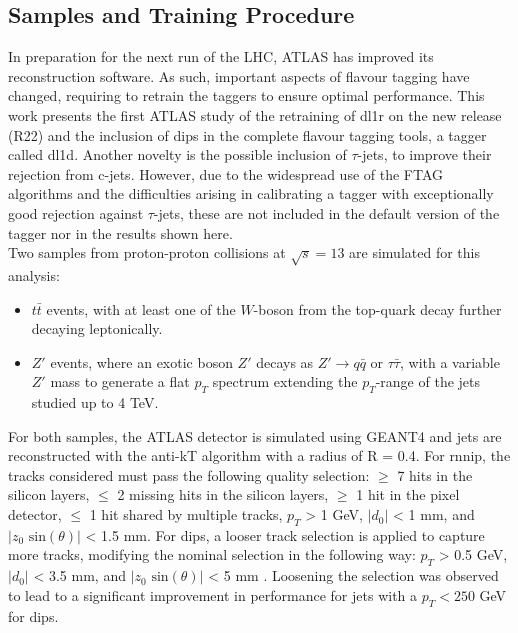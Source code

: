 \subsection{Samples and Training Procedure}
In preparation for the next run of the LHC, ATLAS has improved its reconstruction software. As such, important aspects of flavour tagging have changed, requiring to retrain the taggers to ensure optimal performance. This work presents the first ATLAS study of the retraining of \gls{dl1r} on the new release (R22) and the inclusion of \gls{dips} in the complete flavour tagging tools, a tagger called \gls{dl1d}. Another novelty is the possible inclusion of $\tau$-jets, to improve their rejection from c-jets. However, due to the widespread use of the FTAG algorithms and the difficulties arising in calibrating a tagger with exceptionally good rejection against $\tau$-jets, these are not included in the default version of the tagger nor in the results shown here.  \\ 

Two samples from proton-proton collisions at $\sqrt{s} = 13$ are simulated for this analysis:
\begin{itemize}
\item $t\bar{t}$ events, with at least one of the $W$-boson from the top-quark decay further decaying leptonically. 
\item $Z'$ events, where an exotic boson $Z'$ decays as $Z' \rightarrow q\bar{q} \textrm{ or } \tau \bar{\tau}$, with a variable $Z'$ mass to generate a flat $p_T$ spectrum extending the $p_T$-range of the jets studied up to 4 TeV.
\end{itemize}

For both samples, the ATLAS detector is simulated using GEANT4 \cite{Agostinelli:602040} and jets are reconstructed with the anti-kT algorithm with a radius of R = 0.4.  For \gls{rnnip}, the tracks considered must pass the following quality selection: $\geq$ 7 hits in the silicon layers, $\leq$ 2 missing hits in the silicon layers, $\geq$ 1 hit in the pixel detector, $\leq$ 1 hit shared by multiple tracks, $p_T$ > 1 GeV, $|d_0|$ < 1 mm, and $|z_0 \textrm{ sin}(\theta)|$ < 1.5 mm. For \gls{dips}, a looser track selection is applied to capture more tracks, modifying the nominal selection in the following way: $p_T$ > 0.5 GeV, $|d_0|$ < 3.5 mm, and $|z_0 \textrm{ sin}(\theta)|$ < 5 mm \cite{ATL-PHYS-PUB-2020-014}. Loosening the selection was observed to lead to a significant improvement in performance for jets with a $p_T < 250$ GeV for \gls{dips}. \\

